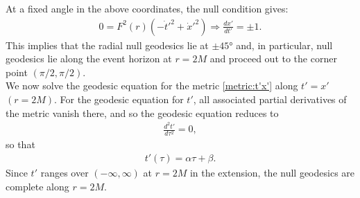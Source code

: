\documentclass[pdflatex,sn-mathphys-num]{sn-jnl}
\newcommand{\Junbang}[1]{{\color{magenta}#1}}
\theoremstyle{definition}
\begin{document}
At a fixed angle in the above coordinates, the null condition gives:
    \begin{align}\label{null 2M}
        0 = F^2(r)(-\dot{t}'^2 + \dot{x}'^2) \Rightarrow \frac{dx'}{dt'} = \pm 1.
    \end{align}
This implies that the radial null geodesics lie at $\pm 45$° and, in particular, null geodesics lie along the event horizon at $r = 2M$ and proceed out to the corner point $(\pi/2,\pi/2)$.\\
    
    We now solve the geodesic equation for the metric \ref{metric:t'x'} along $t'=x'$ $(r = 2M)$. For the geodesic equation for $t'$, all associated partial derivatives of the metric vanish there, and so the geodesic equation reduces to
    \begin{align*}
        \frac{d^2t'}{d\tau^2} = 0,
    \end{align*}
    so that
    \begin{align*}
        t'(\tau) = \alpha \tau + \beta .
    \end{align*}
    Since $t'$ ranges over $(-\infty,\infty)$ at $r = 2M$ in the extension, the null geodesics are complete along $r = 2M$.\\
    
\end{document}
